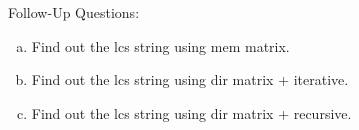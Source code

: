 Follow-Up Questions:
\begin{enumerate}[(a)]
    \item Find out the lcs string using mem matrix.
    \item  Find out the lcs string using dir matrix + iterative.
    \item Find out the lcs string using dir matrix + recursive.
\end{enumerate}
